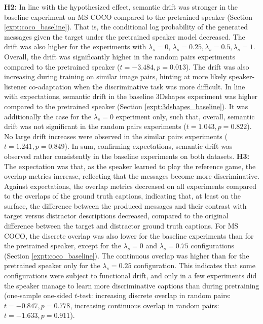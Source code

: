 \textbf{H2:} In line with the hypothesized effect, semantic drift was stronger in the baseline experiment on MS COCO compared to the pretrained speaker (Section \ref{expt:coco_baseline}). That is, the conditional log probability of the generated messages given the target under the pretrained speaker model decreased. The drift was also higher for the experiments with $\lambda_s=0$, $\lambda_s=0.25, \lambda_s=0.5, \lambda_s=1$. Overall, the drift was significantly higher in the random pairs experiments compared to the pretrained speaker ($t = -3.484, p = 0.013$).
The drift was also increasing during training on similar image pairs, hinting at more likely speaker-listener co-adaptation when the discriminative task was more difficult.
In line with expectations, semantic drift in the baseline 3Dshapes experiment was higher compared to the pretrained speaker (Section \ref{expt:3dshapes_baseline}). It was additionally the case for the $\lambda_s=0$ experiment only, such that, overall, semantic drift was not significant in the random pairs experiments ($t = 1.043, p = 0.822$). No large drift increases were observed in the similar pairs experiments ($t=1.241, p= 0.849$). 
In sum, confirming expectations, semantic drift was observed rather consistently in the baseline experiments on both datasets.\newline
\textbf{H3:} The expectation was that, as the speaker learned to play the reference game, the overlap metrics increase, reflecting that the messages become more discriminative. Against expectations, the overlap metrics decreased on all experiments compared to the overlaps of the ground truth captions, indicating that, at least on the surface, the difference between the produced messages and their contrast with target versus distractor descriptions decreased, compared to the original difference between the target and distractor ground truth captions. For MS COCO, the discrete overlap was also lower for the baseline experiments than for the pretrained speaker, except for the $\lambda_s = 0$ and $\lambda_s = 0.75$ configurations (Section \ref{expt:coco_baseline}). The continuous overlap was higher than for the pretrained speaker only for the $\lambda_s = 0.25$ configuration. This indicates that some configurations were subject to functional drift, and only in a few experiments did the speaker manage to learn more discriminative captions than during pretraining (one-sample one-sided $t$-test: increasing discrete overlap in random pairs: $t = -0.847, p =0.778$, increasing continuous overlap in random pairs: $t = -1.633, p = 0.911$).
